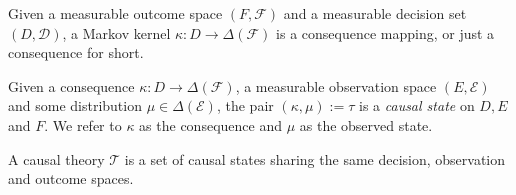 \begin{definition}[Consequences]
Given a measurable outcome space $(F,\mathcal{F})$ and a measurable decision set $(D,\mathcal{D})$, a Markov kernel $\kappa:D \to \Delta(\mathcal{F})$ is a consequence mapping, or just a consequence for short.
\end{definition}

\begin{definition}
Given a consequence $\kappa:D\to \Delta(\mathcal{F})$, a measurable observation space $(E,\mathcal{E})$ and some distribution $\mu\in \Delta(\mathcal{E})$, the pair $(\kappa,\mu):=\tau$ is a \emph{causal state} on $D, E$ and $F$. We refer to $\kappa$ as the consequence and $\mu$ as the observed state.
\end{definition}

\begin{definition}\label{def:causal_theory}
A causal theory $\mathscr{T}$ is a set of causal states sharing the same decision, observation and outcome spaces. 
\end{definition}


